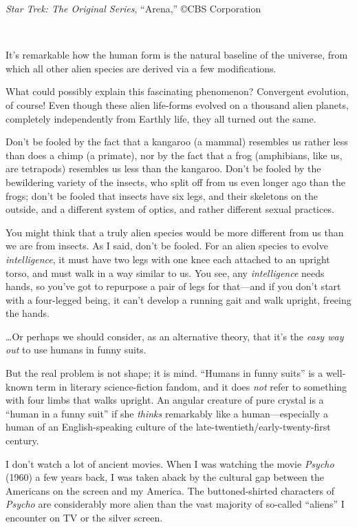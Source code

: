 {\centering
{}
 \newline
 \textit{Star Trek: The Original Series},
``Arena,'' \copyright  CBS Corporation
\par}


\bigskip


 ~


 It's remarkable how the human form is the natural
baseline of the universe, from which all other alien species are
derived via a few modifications.


 What could possibly explain this fascinating phenomenon?
Convergent evolution, of course! Even though these alien life-forms
evolved on a thousand alien planets, completely independently from
Earthly life, they all turned out the same.


 Don't be fooled by the fact that a kangaroo (a
mammal) resembles us rather less than does a chimp (a primate), nor by
the fact that a frog (amphibians, like us, are tetrapods) resembles us
less than the kangaroo. Don't be fooled by the
bewildering variety of the insects, who split off from us even longer
ago than the frogs; don't be fooled that insects have
six legs, and their skeletons on the outside, and a different system of
optics, and rather different sexual practices.


 You might think that a truly alien species would be more different
from us than we are from insects. As I said, don't be
fooled. For an alien species to evolve \textit{intelligence}, it must
have two legs with one knee each attached to an upright torso, and must
walk in a way similar to us. You see, any \textit{intelligence} needs
hands, so you've got to repurpose a pair of legs for
that---and if you don't start with a four-legged being,
it can't develop a running gait and walk upright,
freeing the hands.


 \ldots Or perhaps we should consider, as an alternative theory,
that it's the \textit{easy way out} to use humans in
funny suits.


 But the real problem is not shape; it is mind.
``Humans in funny suits'' is a
well-known term in literary science-fiction fandom, and it does
\textit{not} refer to something with four limbs that walks upright. An
angular creature of pure crystal is a ``human in a
funny suit'' if she \textit{thinks} remarkably like a
human---especially a human of an English-speaking culture of the
late-twentieth/early-twenty-first century.


 I don't watch a lot of ancient movies. When I was
watching the movie \textit{Psycho} (1960) a few years back, I was taken
aback by the cultural gap between the Americans on the screen and my
America. The buttoned-shirted characters of \textit{Psycho} are
considerably more alien than the vast majority of so-called
``aliens'' I encounter on TV or the
silver screen.


